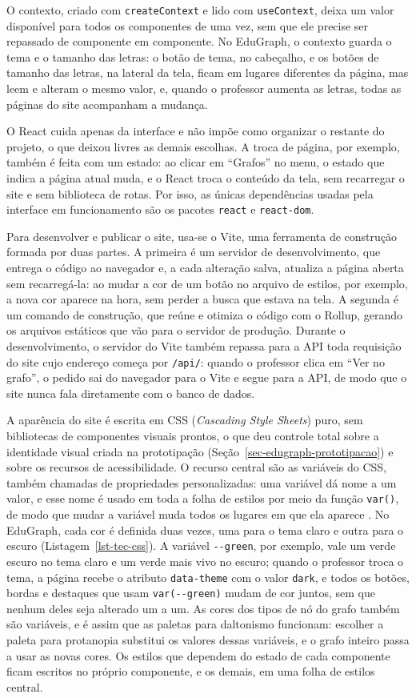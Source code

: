 O contexto, criado com \texttt{createContext} e lido com \texttt{useContext}, deixa um valor disponível para todos os componentes de uma vez, sem que ele precise ser repassado de componente em componente. No EduGraph, o contexto guarda o tema e o tamanho das letras: o botão de tema, no cabeçalho, e os botões de tamanho das letras, na lateral da tela, ficam em lugares diferentes da página, mas leem e alteram o mesmo valor, e, quando o professor aumenta as letras, todas as páginas do site acompanham a mudança.

O React cuida apenas da interface e não impõe como organizar o restante do projeto, o que deixou livres as demais escolhas. A troca de página, por exemplo, também é feita com um estado: ao clicar em ``Grafos'' no menu, o estado que indica a página atual muda, e o React troca o conteúdo da tela, sem recarregar o site e sem biblioteca de rotas. Por isso, as únicas dependências usadas pela interface em funcionamento são os pacotes \texttt{react} e \texttt{react-dom}.

Para desenvolver e publicar o site, usa-se o Vite, uma ferramenta de construção formada por duas partes. A primeira é um servidor de desenvolvimento, que entrega o código ao navegador e, a cada alteração salva, atualiza a página aberta sem recarregá-la: ao mudar a cor de um botão no arquivo de estilos, por exemplo, a nova cor aparece na hora, sem perder a busca que estava na tela. A segunda é um comando de construção, que reúne e otimiza o código com o Rollup, gerando os arquivos estáticos que vão para o servidor de produção. Durante o desenvolvimento, o servidor do Vite também repassa para a API toda requisição do site cujo endereço começa por \texttt{/api/}: quando o professor clica em ``Ver no grafo'', o pedido sai do navegador para o Vite e segue para a API, de modo que o site nunca fala diretamente com o banco de dados.

A aparência do site é escrita em CSS (\textit{Cascading Style Sheets}) puro, sem bibliotecas de componentes visuais prontos, o que deu controle total sobre a identidade visual criada na prototipação (Seção~\ref{sec-edugraph-prototipacao}) e sobre os recursos de acessibilidade. O recurso central são as variáveis do CSS, também chamadas de propriedades personalizadas: uma variável dá nome a um valor, e esse nome é usado em toda a folha de estilos por meio da função \texttt{var()}, de modo que mudar a variável muda todos os lugares em que ela aparece \cite{mdn2026cssvar}. No EduGraph, cada cor é definida duas vezes, uma para o tema claro e outra para o escuro (Listagem~\ref{lst-tec-css}). A variável \texttt{-{}-green}, por exemplo, vale um verde escuro no tema claro e um verde mais vivo no escuro; quando o professor troca o tema, a página recebe o atributo \texttt{data-theme} com o valor \texttt{dark}, e todos os botões, bordas e destaques que usam \texttt{var(-{}-green)} mudam de cor juntos, sem que nenhum deles seja alterado um a um. As cores dos tipos de nó do grafo também são variáveis, e é assim que as paletas para daltonismo funcionam: escolher a paleta para protanopia substitui os valores dessas variáveis, e o grafo inteiro passa a usar as novas cores. Os estilos que dependem do estado de cada componente ficam escritos no próprio componente, e os demais, em uma folha de estilos central.

